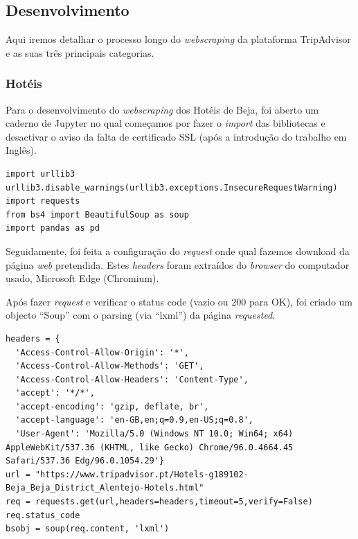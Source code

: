 \documentclass[a4paper,10pt]{article}
\begin{document}
\newpage

\subsection{Desenvolvimento}

Aqui iremos detalhar o processo longo do \textit{webscraping} da plataforma TripAdvisor e as suas três principais categorias.

\subsubsection{Hotéis}

Para o desenvolvimento do \textit{webscraping} dos Hotéis de Beja, foi aberto um caderno de Jupyter no qual começamos por fazer o \textit{import} das bibliotecas e desactivar o aviso da falta de certificado SSL (após a introdução do trabalho em Inglês).

\begin{verbatim}
import urllib3
urllib3.disable_warnings(urllib3.exceptions.InsecureRequestWarning)
import requests
from bs4 import BeautifulSoup as soup
import pandas as pd
\end{verbatim}

Seguidamente, foi feita a configuração do \textit{request} onde qual fazemos download da página \textit{web} pretendida. Estes \textit{headers} foram extraídos do \textit{browser} do computador usado, Microsoft Edge (Chromium).

Após fazer \textit{request} e verificar o status code (vazio ou 200 para OK), foi criado um objecto ``Soup'' com o parsing (via ``lxml'') da página \textit{requested}.

\begin{verbatim}
headers = {
  'Access-Control-Allow-Origin': '*',
  'Access-Control-Allow-Methods': 'GET',
  'Access-Control-Allow-Headers': 'Content-Type',
  'accept': '*/*',
  'accept-encoding': 'gzip, deflate, br',
  'accept-language': 'en-GB,en;q=0.9,en-US;q=0.8',
  'User-Agent': 'Mozilla/5.0 (Windows NT 10.0; Win64; x64) AppleWebKit/537.36 (KHTML, like Gecko) Chrome/96.0.4664.45 Safari/537.36 Edg/96.0.1054.29'}
url = "https://www.tripadvisor.pt/Hotels-g189102-Beja_Beja_District_Alentejo-Hotels.html"
req = requests.get(url,headers=headers,timeout=5,verify=False)
req.status_code
bsobj = soup(req.content, 'lxml')
\end{verbatim}
\end{document}
